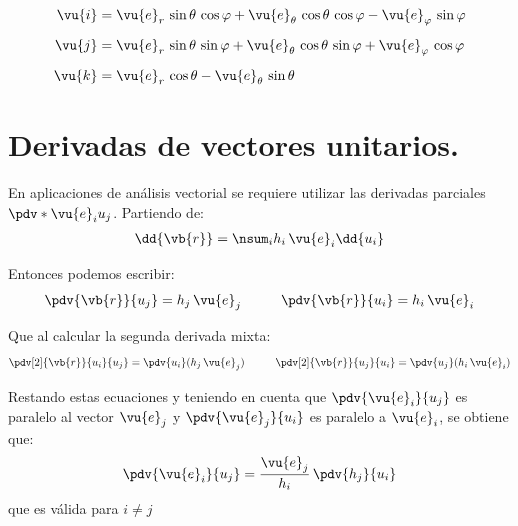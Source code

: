 \begin{align*}
\vu{i} &= \vu{e}_{r} \, \sin \theta \, \cos \varphi + \vu{e}_{\theta} \, \cos \theta \, \cos \varphi - \vu{e}_{\varphi} \, \sin \varphi \\[0.5em]
\vu{j} &= \vu{e}_{r} \, \sin \theta \, \sin \varphi + \vu{e}_{\theta} \, \cos \theta \, \sin \varphi + \vu{e}_{\varphi} \, \cos \varphi \\[0.5em]
\vu{k} &= \vu{e}_{r} \, \cos \theta - \vu{e}_{\theta} \, \sin \theta
\end{align*}

\section{Derivadas de vectores unitarios.}

En aplicaciones de análisis vectorial se requiere utilizar las derivadas parciales $\pdv*{\vu{e}_{i}}{u_{j}}$. Partiendo de:
\begin{align*}
\dd{\vb{r}} = \nsum_{i} h_{i} \, \vu{e}_{i} \dd{u_{i}}
\end{align*}
\par
Entonces podemos escribir:
\begin{align*}
\pdv{\vb{r}}{u_{j}} = h_{j} \, \vu{e}_{j} \hspace{1cm} \pdv{\vb{r}}{u_{i}} = h_{i} \, \vu{e}_{i}
\end{align*}
\par
Que al calcular la segunda derivada mixta:
\begin{align*}
\pdv[2]{\vb{r}}{u_{i}}{u_{j}} = \pdv{u_{i}} (h_{j} \, \vu{e}_{j}) \hspace{1cm} \pdv[2]{\vb{r}}{u_{j}}{u_{i}} = \pdv{u_{j}} (h_{i} \, \vu{e}_{i})
\end{align*}

Restando estas ecuaciones y teniendo en cuenta que $\displaystyle \pdv{\vu{e}_{i}}{u_{j}}$ es paralelo al vector $\vu{e}_{j}$ y $\displaystyle \pdv{\vu{e}_{j}}{u_{i}}$ es paralelo a $\vu{e}_{i}$, se obtiene que:
\begin{align*}
\pdv{\vu{e}_{i}}{u_{j}} = \dfrac{\vu{e}_{j}}{h_{i}} \, \pdv{h_{j}}{u_{i}}
\end{align*}
que es válida para $i \neq j$

